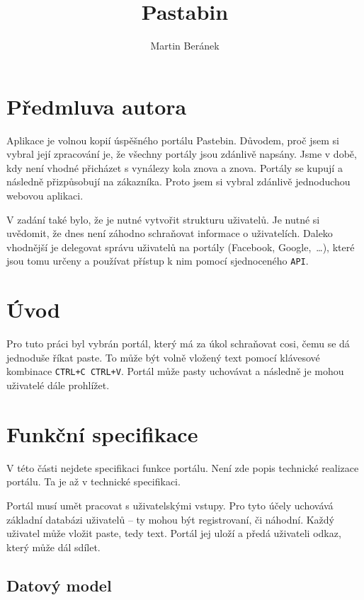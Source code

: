 \documentclass[a4paper,10pt]{report}
\begin{document}
\title{Pastabin}
\author{Martin Beránek}
\maketitle

\tableofcontents
\listoffigures

\chapter{Předmluva autora}

Aplikace je volnou kopií úspěšného portálu Pastebin. Důvodem, proč jsem si vybral její zpracování je, že všechny portály jsou zdánlivě napsány. Jsme v době, kdy není vhodné přicházet s vynálezy kola znova a znova. Portály se kupují a následně přizpůsobují na zákazníka. Proto jsem si vybral zdánlivě jednoduchou webovou aplikaci.

V zadání také bylo, že je nutné vytvořit strukturu uživatelů. Je nutné si uvědomit, že dnes není záhodno schraňovat informace o uživatelích. Daleko vhodnější je delegovat správu uživatelů na portály (Facebook, Google,~\dots), které jsou tomu určeny a používat přístup k nim pomocí sjednoceného \texttt{API}.

\chapter{Úvod}

Pro tuto práci byl vybrán portál, který má za úkol schraňovat cosi, čemu se dá jednoduše říkat paste. To může být volně vložený text pomocí klávesové kombinace \texttt{CTRL+C CTRL+V}. Portál může pasty uchovávat a následně je mohou uživatelé dále prohlížet.

\chapter{Funkční specifikace}

V této části nejdete specifikaci funkce portálu. Není zde popis technické realizace portálu. Ta je až v technické specifikaci.

Portál musí umět pracovat s uživatelskými vstupy. Pro tyto účely uchovává základní databázi uživatelů -- ty mohou být registrovaní, či náhodní. Každý uživatel může vložit paste, tedy text. Portál jej uloží a předá uživateli odkaz, který může dál sdílet.

\section{Datový model}
\end{document}

